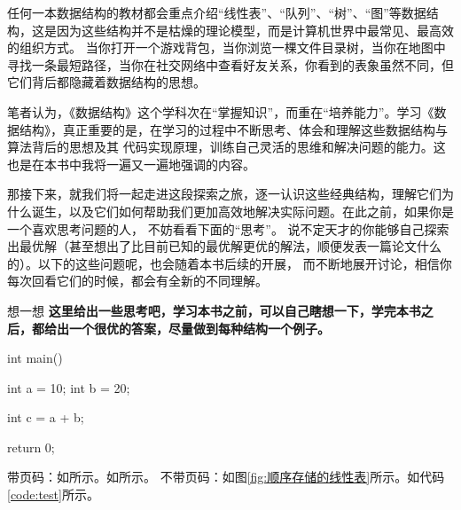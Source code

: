 任何一本数据结构的教材都会重点介绍“线性表”、“队列”、“树”、“图”等数据结构，这是因为这些结构并不是枯燥的理论模型，而是计算机世界中最常见、最高效的组织方式。
当你打开一个游戏背包，当你浏览一棵文件目录树，当你在地图中寻找一条最短路径，当你在社交网络中查看好友关系，你看到的表象虽然不同，但它们背后都隐藏着数据结构的思想。

笔者认为，《数据结构》这个学科次在“掌握知识”，而重在“培养能力”。学习《数据结构》，真正重要的是，在学习的过程中不断思考、体会和理解这些数据结构与算法背后的思想及其
代码实现原理，训练自己灵活的思维和解决问题的能力。这也是在本书中我将一遍又一遍地强调的内容。

那接下来，就我们将一起走进这段探索之旅，逐一认识这些经典结构，理解它们为什么诞生，以及它们如何帮助我们更加高效地解决实际问题。在此之前，如果你是一个喜欢思考问题的人，
不妨看看下面的“思考”。
说不定天才的你能够自己探索出最优解（甚至想出了比目前已知的最优解更优的解法，顺便发表一篇论文什么的）。以下的这些问题呢，也会随着本书后续的开展，
而不断地展开讨论，相信你每次回看它们的时候，都会有全新的不同理解。
\begin{thinkbox}{想一想}
{\color{red}\textbf{这里给出一些思考吧，学习本书之前，可以自己瞎想一下，学完本书之后，都给出一个很优的答案，尽量做到每种结构一个例子。}}
\end{thinkbox}


\begin{cppcodeNum}[label={code:test}, codetitle={测试代码}]

int main() {
    int a = 10;
    int b = 20;

    int c = a + b;

    return 0;
}

\end{cppcodeNum}

带页码：如所示。如所示。
不带页码：如图\ref{fig:顺序存储的线性表}所示。如代码\ref{code:test}所示。